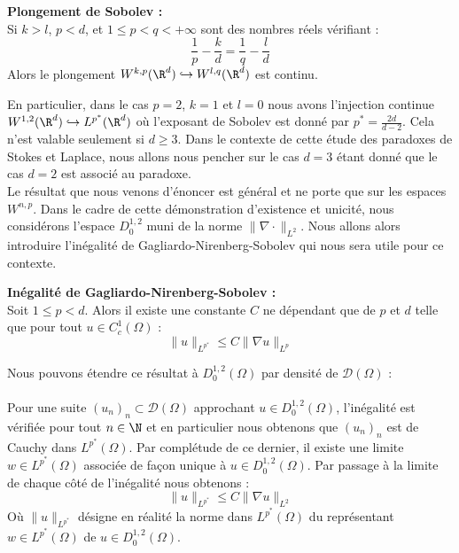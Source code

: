\begin{theorembox}
\begin{theorem}
    \textbf{Plongement de Sobolev :}\\
    Si $k > l$, $p < d$, et $1 \leq p < q < +\infty$ sont des nombres réels vérifiant :
    $$ \frac{1}{p} - \frac{k}{d} = \frac{1}{q} - \frac{l}{d} $$
    Alors le plongement $W^{k,p}(\R^d) \hookrightarrow W^{l,q}(\R^d)$ est continu.
\end{theorem}
\end{theorembox}
En particulier, dans le cas $p = 2$, $k = 1$ et $l = 0$ nous avons l'injection continue $W^{1,2}(\R^d) \hookrightarrow L^{p^*}(\R^d)$ où l'exposant de Sobolev est donné par $p^* = \frac{2d}{d - 2}$. 
Cela n'est valable seulement si $d \geq 3$. Dans le contexte de cette étude des paradoxes de Stokes et Laplace, nous allons nous pencher sur le cas $d = 3$ étant donné que le cas $d = 2$ est associé au paradoxe. \\
Le résultat que nous venons d'énoncer est général et ne porte que sur les espaces $W^{n,p}$. Dans le cadre de cette démonstration d'existence et unicité, nous considérons l'espace $D^{1,2}_0$ muni de la norme $\|\nabla \cdot \|_{L^2}$. Nous allons alors introduire l'inégalité de Gagliardo-Nirenberg-Sobolev qui nous sera utile pour ce contexte.
\begin{theorembox}
\begin{theorem}
    \textbf{Inégalité de Gagliardo-Nirenberg-Sobolev :}\\
    Soit $1 \leq p < d$. Alors il existe une constante $C$ ne dépendant que de $p$ et $d$ telle que pour tout $u \in C^1_c(\Omega)$ :
    $$ \| u \|_{L^{p^*}} \leq C \| \nabla u \|_{L^p} $$
\end{theorem}
\end{theorembox} 
Nous pouvons étendre ce résultat à $D_0^{1,2}(\Omega)$ par densité de $\mathcal{D}(\Omega)$ : \\
\\
Pour une suite $(u_n)_n \subset \mathcal{D}(\Omega)$ approchant $u \in D^{1,2}_0(\Omega)$, l'inégalité est vérifiée pour tout $n \in \N$ et en particulier nous obtenons que $(u_n)_n$ est de Cauchy dans $L^{p^*}(\Omega)$. Par complétude de ce dernier, il existe une limite $w \in L^{p^*}(\Omega)$ associée de façon unique à $u \in D^{1,2}_0(\Omega)$. Par passage à la limite de chaque côté de l'inégalité nous obtenons :
$$ \|u\|_{L^{p^*}} \leq C \| \nabla u \|_{L^2} $$
Où $\|u\|_{L^{p^*}}$ désigne en réalité la norme dans $L^{p^*}(\Omega)$ du représentant $w \in L^{p^*}(\Omega)$ de $u \in D_0^{1,2}(\Omega)$. \\
